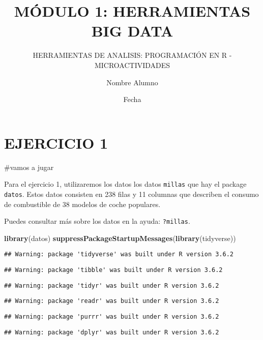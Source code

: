 \documentclass[]{article}
\title{MÓDULO 1: HERRAMIENTAS BIG DATA}
\subtitle{HERRAMIENTAS DE ANALISIS: PROGRAMACIÓN EN R - MICROACTIVIDADES}
\author{Nombre Alumno}
\date{Fecha}
\newenvironment{Shaded}{\begin{snugshade}}{\end{snugshade}}
\newcommand{\KeywordTok}[1]{\textcolor[rgb]{0.13,0.29,0.53}{\textbf{#1}}}
\newcommand{\NormalTok}[1]{#1}
\begin{document}
\maketitle

\hypertarget{ejercicio-1}{%
\section{EJERCICIO 1}\label{ejercicio-1}}

\#vamos a jugar

Para el ejercicio 1, utilizaremos los datos los datos \texttt{millas}
que hay el package \texttt{datos}. Estos datos consisten en 238 filas y
11 columnas que describen el consumo de combustible de 38 modelos de
coche populares.

Puedes consultar más sobre los datos en la ayuda: \texttt{?millas}.

\begin{Shaded}
\begin{Highlighting}[]
\KeywordTok{library}\NormalTok{(datos)}
\KeywordTok{suppressPackageStartupMessages}\NormalTok{(}\KeywordTok{library}\NormalTok{(tidyverse))}
\end{Highlighting}
\end{Shaded}

\begin{verbatim}
## Warning: package 'tidyverse' was built under R version 3.6.2
\end{verbatim}

\begin{verbatim}
## Warning: package 'tibble' was built under R version 3.6.2
\end{verbatim}

\begin{verbatim}
## Warning: package 'tidyr' was built under R version 3.6.2
\end{verbatim}

\begin{verbatim}
## Warning: package 'readr' was built under R version 3.6.2
\end{verbatim}

\begin{verbatim}
## Warning: package 'purrr' was built under R version 3.6.2
\end{verbatim}

\begin{verbatim}
## Warning: package 'dplyr' was built under R version 3.6.2
\end{verbatim}
\end{document}
